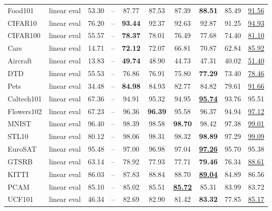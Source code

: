 \documentclass[10pt,twocolumn,letterpaper]{article}
\begin{document}
\begin{table*}[t]
\begin{tabular}{l@{\ }c|ccccccc|c}
Food101 \cite{bossard14} & linear eval & 53.30 & -- & 87.77 & 87.53 & 87.39 & \textbf{88.51} & 85.49 & \underline{91.56} \\
CIFAR10 \cite{krizhevsky2009learning} & linear eval & 76.20 & -- & \textbf{93.44} & 92.37 & 92.63 & 92.87 & 91.25 & \underline{94.93} \\
CIFAR100 \cite{krizhevsky2009learning} & linear eval & 55.57 & -- & \textbf{78.37} & 78.01 & 76.49 & 77.68 & 74.40 & \underline{81.10} \\
Cars \cite{KrauseStarkDengFei-Fei_3DRR2013} & linear eval & 14.71 & -- & \textbf{72.12} & 72.07 & 66.81 & 70.87 & 62.84 & \underline{85.92} \\
Aircraft \cite{maji13fine-grained} & linear eval & 13.83 & -- & \textbf{49.74} & 48.90 & 44.73 & 47.31 & 40.02 & \underline{51.40} \\
DTD \cite{cimpoi14describing} & linear eval & 55.53 & -- & 76.86 & 76.91 & 75.80 & \textbf{77.29} & 73.40 & \underline{78.46} \\
Pets \cite{parkhi12a} & linear eval & 34.48 & -- & \textbf{84.98} & 84.93 & 82.77 & 84.82 & 79.61 & \underline{91.66} \\
Caltech101 \cite{FeiFei2004LearningGV} & linear eval & 67.36 & -- & 94.91 & 95.32 & 94.95 & \underline{\textbf{95.74}} & 93.76 & 95.51 \\
Flowers102 \cite{Nilsback08} & linear eval & 67.23 & -- & 96.36 & \textbf{96.39} & 95.58 & 96.37 & 94.94 & \underline{97.12} \\
MNIST \cite{lecun2010mnist} & linear eval & 96.40 & -- & 98.39 & 98.58 & \textbf{98.70} & 98.42 & 97.38 & \underline{99.01} \\
STL10 \cite{coates2011analysis} & linear eval & 80.12 & -- & 98.06 & 98.31 & 98.32 & \textbf{98.89} & 97.29 & \underline{99.09} \\
EuroSAT \cite{helber2019eurosat} & linear eval & 95.48 & -- & 97.00 & 96.98 & 97.04 & \underline{\textbf{97.26}} & 95.70 & 95.38 \\
GTSRB \cite{stallkamp2011german} & linear eval & 63.14 & -- & 78.92 & 77.93 & 77.71 & \textbf{79.46} & 76.34 & \underline{88.61} \\
KITTI \cite{geiger2013vision} & linear eval & 86.03 & -- & 87.83 & 88.84 & 88.70 & \underline{\textbf{89.04}} & 84.89 & 86.56 \\
PCAM \cite{veeling2018rotation} & linear eval & 85.10 & -- & 85.02 & 85.51 & \underline{\textbf{85.72}} & 85.31 & 83.99 & 83.72 \\
UCF101 \cite{soomro2012ucf101} & linear eval & 46.34 & -- & 82.69 & 82.90 & 81.42 & \textbf{83.32} & 77.85 & \underline{85.17} \\

\end{tabular}
\end{table*}
\end{document}
